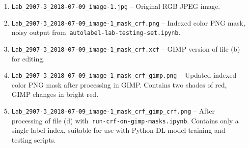 \documentclass[11pt]{article} %
\begin{document}
\begin{enumerate}
\begin{enumerate}
\item \texttt{Lab\_2907-3\_2018-07-09\_image-1.jpg} -- Original RGB JPEG image.
\item \texttt{Lab\_2907-3\_2018-07-09\_image-1\_mask\_crf.png} -- Indexed color 
PNG mask, noisy output from~\texttt{autolabel-lab-testing-set.ipynb}.
\item \texttt{Lab\_2907-3\_2018-07-09\_image-1\_mask\_crf.xcf} -- GIMP version 
of file (b) for editing.
\item \texttt{Lab\_2907-3\_2018-07-09\_image-1\_mask\_crf\_gimp.png} -- Updated 
indexed color PNG mask after processing in GIMP. Contains two shades of red, 
GIMP changes in bright red.
\item \texttt{Lab\_2907-3\_2018-07-09\_image-1\_mask\_crf\_gimp\_crf.png} -- 
After processing of file (d) with~\texttt{run-crf-on-gimp-masks.ipynb}. Contains
only a single label index, suitable for use with Python DL model training and
testing scripts.

\end{enumerate}

\end{enumerate}
\end{document}
